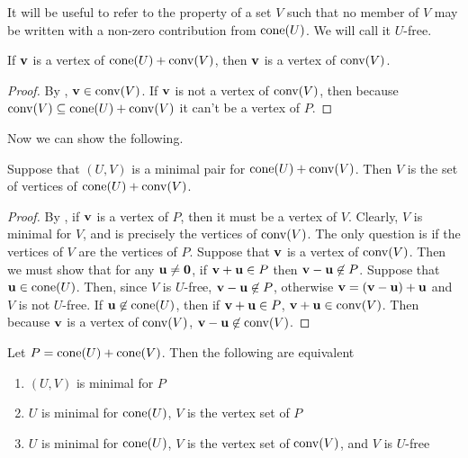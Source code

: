It will be useful to refer to the property of a set $V$ such that no member of $V$ may be written with a non-zero contribution from $\operatorname{cone}(U)$.  We will call it $U$-free.

\begin{Prop}\label{v_is_vert}
	If $\mathbf{v}$ is a vertex of $\operatorname{cone}(U) + \operatorname{conv}(V)$, then $\mathbf{v}$ is a vertex of $\operatorname{conv}(V)$.
\end{Prop}

\begin{proof}
	By , $\mathbf{v}\in\operatorname{conv}(V)$.  If $\mathbf{v}$ is not a vertex of $\operatorname{conv}(V)$, then because $\operatorname{conv}(V) \subseteq \operatorname{cone}(U) + \operatorname{conv}(V)$ it can't be a vertex of $P$.
\end{proof}

Now we can show the following.
\begin{Prop}\label{v_min}
	Suppose that $(U,V)$ is a minimal pair for $\operatorname{cone}(U) + \operatorname{conv}(V)$.  Then $V$ is the set of vertices of $\operatorname{cone}(U) + \operatorname{conv}(V)$.
\end{Prop}

\begin{proof}
	By , if $\mathbf{v}$ is a vertex of $P$, then it must be a vertex of $V$.  Clearly, $V$ is minimal for $V$, and is precisely the vertices of $\operatorname{conv}(V)$.  The only question is if the vertices of $V$ are the vertices of $P$.  Suppose that $\mathbf{v}$ is a vertex of $\operatorname{conv}(V)$.  Then we must show that for any $\mathbf{u}\neq\mathbf{0}$, if $\mathbf{v}+\mathbf{u}\in P$ then $\mathbf{v}-\mathbf{u}\not\in P$.  Suppose that $\mathbf{u}\in\operatorname{cone}(U)$.  Then, since $V$ is $U$-free, $\mathbf{v}-\mathbf{u}\not\in P$, otherwise $\mathbf{v}=(\mathbf{v}-\mathbf{u})+\mathbf{u}$ and $V$ is not $U$-free.  If $\mathbf{u}\not\in\operatorname{cone}(U)$, then if $\mathbf{v}+\mathbf{u}\in P$, $\mathbf{v}+\mathbf{u}\in\operatorname{conv}(V)$.  Then because $\mathbf{v}$ is a vertex of $\operatorname{conv}(V)$, $\mathbf{v}-\mathbf{u}\not\in\operatorname{conv}(V)$.
\end{proof}

\begin{Prop}
	Let $P = \operatorname{cone}(U)+ \operatorname{cone}(V)$.  Then the following are equivalent
	\begin{enumerate}
		\item $(U,V)$ is minimal for $P$
		\item $U$ is minimal for $\operatorname{cone}(U)$, $V$ is the vertex set of $P$
		\item $U$ is minimal for $\operatorname{cone}(U)$, $V$ is the vertex set of $\operatorname{conv}(V)$, and $V$ is $U$-free
	\end{enumerate}
\end{Prop}

